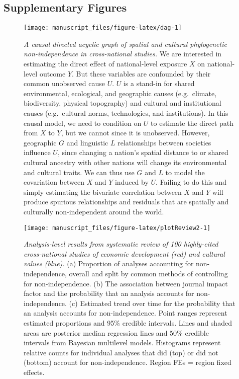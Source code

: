 \documentclass[
  man,floatsintext]{apa6}
\begin{document}
\newpage

\hypertarget{supplementary-figures}{%
\subsection{Supplementary Figures}\label{supplementary-figures}}



\begin{figure}[H]
\texttt{[image: manuscript\_files/figure-latex/dag-1]} \caption{\emph{A causal directed acyclic graph of spatial and cultural phylogenetic non-independence in cross-national studies.} We are interested in estimating the direct effect of national-level exposure \(X\) on national-level outcome \(Y\). But these variables are confounded by their common unobserved cause \(U\). \(U\) is a stand-in for shared environmental, ecological, and geographic causes (e.g.~climate, biodiversity, physical topography) and cultural and institutional causes (e.g.~cultural norms, technologies, and institutions). In this causal model, we need to condition on \(U\) to estimate the direct path from \(X\) to \(Y\), but we cannot since it is unobserved. However, geographic \(G\) and linguistic \(L\) relationships between societies influence \(U\), since changing a nation's spatial distance to or shared cultural ancestry with other nations will change its environmental and cultural traits. We can thus use \(G\) and \(L\) to model the covariation between \(X\) and \(Y\) induced by \(U\). Failing to do this and simply estimating the bivariate correlation between \(X\) and \(Y\) will produce spurious relationships and residuals that are spatially and culturally non-independent around the world.}\label{fig:dag}
\end{figure}

\newpage



\begin{figure}[H]
\texttt{[image: manuscript\_files/figure-latex/plotReview2-1]} \caption{\emph{Analysis-level results from systematic review of 100 highly-cited cross-national studies of economic development (red) and cultural values (blue).} (a) Proportion of analyses accounting for non-independence, overall and split by common methods of controlling for non-independence. (b) The association between journal impact factor and the probability that an analysis accounts for non-independence. (c) Estimated trend over time for the probability that an analysis accounts for non-independence. Point ranges represent estimated proportions and 95\% credible intervals. Lines and shaded areas are posterior median regression lines and 50\% credible intervals from Bayesian multilevel models. Histograms represent relative counts for individual analyses that did (top) or did not (bottom) account for non-independence. Region FEs = region fixed effects.}\label{fig:plotReview2}
\end{figure}
\end{document}
